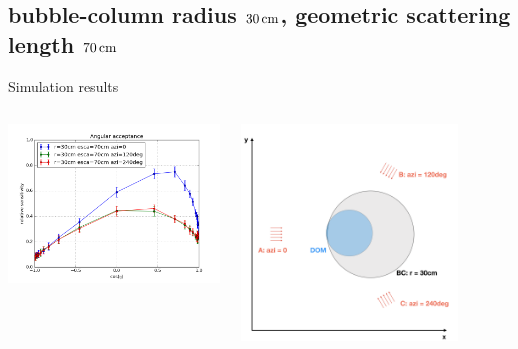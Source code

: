 \subsection{bubble-column radius $30\text{\,cm}$, geometric scattering length $70\text{\,cm}$}
\begin{frame}[fragile]{Simulation results}
  \begin{columns}
    \begin{column}{0.5\textwidth}
      \includegraphics[width=\textwidth]{img/summer_scenario_r30cm_esca70cm}
    \end{column}
    \begin{column}{0.5\textwidth}
      \includegraphics[width=0.8\textwidth]{img/summerscenario-005}
    \end{column}
  \end{columns}


\end{frame}

